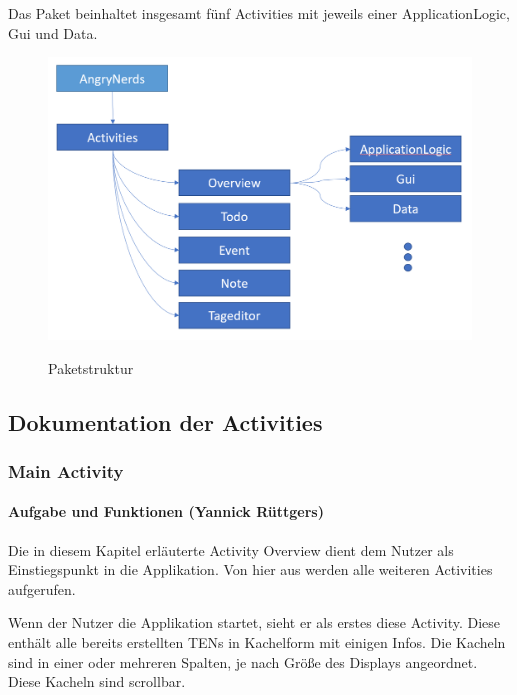 Das Paket beinhaltet insgesamt fünf Activities mit jeweils einer ApplicationLogic, Gui und Data.

\begin{figure}[H]
\centering
\begin{minipage}[t]{1\textwidth} %
\caption{Paketstruktur} %
\includegraphics[width=1\textwidth]{img/Paketstruktur}\\ %
\end{minipage}
\end{figure}

\newpage
\subsection{Dokumentation der Activities}

\subsubsection{Main Activity}

\paragraph{Aufgabe und Funktionen (Yannick Rüttgers)}
Die in diesem Kapitel erläuterte Activity Overview dient dem Nutzer als Einstiegspunkt in die Applikation. Von hier aus werden alle weiteren Activities aufgerufen.

Wenn der Nutzer die Applikation startet, sieht er als erstes diese Activity. Diese enthält alle bereits erstellten TENs in Kachelform mit einigen Infos. Die Kacheln sind in einer oder mehreren Spalten, je nach Größe des Displays angeordnet. Diese Kacheln sind scrollbar.

